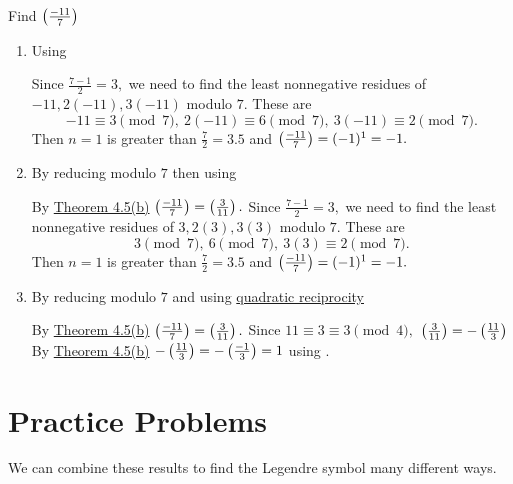 \documentclass{ximera}
\begin{document}
\begin{example}
	Find $\left(\frac{-11}{7}\right)$
		
	\begin{enumerate}
		\item Using 
			
		\begin{solution}
			Since $\frac{7-1}{2}=3,$ we need to find the least nonnegative residues of $-11,2(-11),3(-11)$ modulo $7.$ These are \[-11\equiv 3\pmod{7},\ 2(-11)\equiv 6\pmod{7},\ 3(-11)\equiv 2\pmod{7}.\]
			Then $n=1$ is greater than $\frac{7}{2}=3.5$ and $\left(\frac{-11}{7}\right)=(-1)^1=-1.$
		\end{solution}

		\item By reducing modulo $7$ then using 
			
		\begin{solution}
			By \hyperref[legendre-respects-mod]{Theorem 4.5(b)} $\left(\frac{-11}{7}\right)=\left(\frac{3}{11}\right).$
			Since $\frac{7-1}{2}=3,$ we need to find the least nonnegative residues of $3,2(3),3(3)$ modulo $7.$ These are \[3\pmod{7},\ 6\pmod{7},\ 3(3)\equiv 2\pmod{7}.\]
			Then $n=1$ is greater than $\frac{7}{2}=3.5$ and $\left(\frac{-11}{7}\right)=(-1)^1=-1.$
		\end{solution}

		\item By reducing modulo $7$ and using \hyperref[quad-rec-useful-form]{quadratic reciprocity}
			
		\begin{solution}
			By \hyperref[legendre-respects-mod]{Theorem 4.5(b)} $\left(\frac{-11}{7}\right)=\left(\frac{3}{11}\right).$ Since $11\equiv 3\equiv 3\pmod{4},$ $\left(\frac{3}{11}\right)=-\left(\frac{11}{3}\right)$ By \hyperref[legendre-respects-mod]{Theorem 4.5(b)} $-\left(\frac{11}{3}\right)=-\left(\frac{-1}{3}\right)=1$ using .
		\end{solution}
	\end{enumerate}
\end{example}

\section{Practice Problems}
We can combine these results to find the Legendre symbol many different ways.
\end{document}

